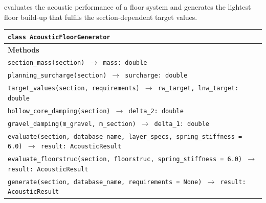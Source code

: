 \documentclass[9pt,a4paper,twocolumn,twoside]{rho-class/rho}
\begin{document}
 evaluates the acoustic performance of a floor system and generates the lightest floor build-up that fulfils the section-dependent target values.

\begin{table}[H]
    \begin{tabularx}{0.49\textwidth}{@{}X@{}}
    \hline
    \textbf{\texttt{class AcousticFloorGenerator}} \\ \hline

    \textbf{Methods} \\
    \texttt{section\_mass(section) $\rightarrow$ mass: double} \\
    \texttt{planning\_surcharge(section) $\rightarrow$ surcharge: double} \\
    \texttt{target\_values(section, requirements) $\rightarrow$ rw\_target, lnw\_target: double} \\
    \texttt{hollow\_core\_damping(section) $\rightarrow$ delta\_2: double} \\
    \texttt{gravel\_damping(m\_gravel, m\_section) $\rightarrow$ delta\_1: double} \\
    \texttt{evaluate(section, database\_name, layer\_specs, spring\_stiffness = 6.0) $\rightarrow$ result: AcousticResult} \\
    \texttt{evaluate\_floorstruc(section, floorstruc, spring\_stiffness = 6.0) $\rightarrow$ result: AcousticResult} \\
    \texttt{generate(section, database\_name, requirements = None) $\rightarrow$ result: AcousticResult} \\ \hline
    \end{tabularx}
\end{table}

\printbibliography

\end{document}
